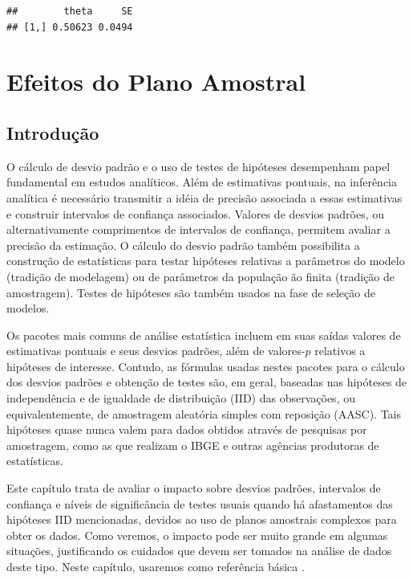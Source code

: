 \documentclass[]{book}
\numberwithin{example}{chapter}
\numberwithin{remark}{chapter}
\numberwithin{definition}{chapter}
\begin{document}
\begin{verbatim}
##        theta     SE
## [1,] 0.50623 0.0494
\end{verbatim}

\chapter{Efeitos do Plano Amostral}\label{epa}

\section{Introdução}\label{introducao}

O cálculo de desvio padrão e o uso de testes de hipóteses desempenham
papel fundamental em estudos analíticos. Além de estimativas pontuais,
na inferência analítica é necessário transmitir a idéia de precisão
associada a essas estimativas e construir intervalos de confiança
associados. Valores de desvios padrões, ou alternativamente comprimentos
de intervalos de confiança, permitem avaliar a precisão da estimação. O
cálculo do desvio padrão também possibilita a construção de estatísticas
para testar hipóteses relativas a parâmetros do modelo (tradição de
modelagem) ou de parâmetros da população ão finita (tradição de
amostragem). Testes de hipóteses são também usados na fase de seleção de
modelos.

Os pacotes mais comuns de análise estatística incluem em suas saídas
valores de estimativas pontuais e seus desvios padrões, além de
valores-\(p\) relativos a hipóteses de interesse. Contudo, as fórmulas
usadas nestes pacotes para o cálculo dos desvios padrões e obtenção de
testes são, em geral, baseadas nas hipóteses de independência e de
igualdade de distribuição (IID) das observações, ou equivalentemente, de
amostragem aleatória simples com reposição (AASC). Tais hipóteses quase
nunca valem para dados obtidos através de pesquisas por amostragem, como
as que realizam o IBGE e outras agências produtoras de estatísticas.

Este capítulo trata de avaliar o impacto sobre desvios padrões,
intervalos de confiança e níveis de significância de testes usuais
quando há afastamentos das hipóteses IID mencionadas, devidos ao uso de
planos amostrais complexos para obter os dados. Como veremos, o impacto
pode ser muito grande em algumas situações, justificando os cuidados que
devem ser tomados na análise de dados deste tipo. Neste capítulo,
usaremos como referência básica \citep{Sk89a}.
\end{document}
